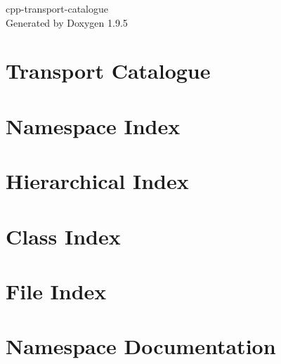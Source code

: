 \documentclass[twoside]{book}
\newcommand{\+}{\discretionary{\mbox{\scriptsize$\hookleftarrow$}}{}{}}
\newcommand{\clearemptydoublepage}{%
    \newpage{\pagestyle{empty}\cleardoublepage}%
  }
\begin{document}
  \raggedbottom
    \hypersetup{pageanchor=false,
                bookmarksnumbered=true,
                pdfencoding=unicode
               }
  \begin{titlepage}
  \vspace*{7cm}
  \begin{center}%
  {\Large cpp-\/transport-\/catalogue}\\
  \vspace*{1cm}
  {\large Generated by Doxygen 1.9.5}\\
  \end{center}
  \end{titlepage}
  \clearemptydoublepage
  \tableofcontents
  \clearemptydoublepage
  \hypersetup{pageanchor=true}
\chapter{Transport Catalogue}
\label{index}\hypertarget{index}{}
\chapter{Namespace Index}

\chapter{Hierarchical Index}

\chapter{Class Index}

\chapter{File Index}

\chapter{Namespace Documentation}





\end{document}
